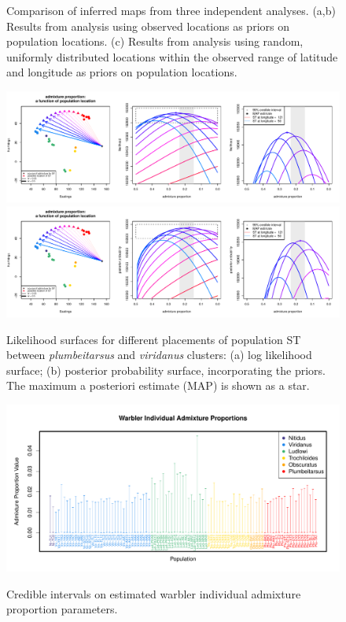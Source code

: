 \documentclass[10pt,letterpaper]{article}
\begin{document}
\begin{figure}
	\caption{Comparison of inferred maps from three independent analyses.  (a,b) Results from analysis using observed locations as priors on population locations.  (c) Results from analysis using random, uniformly distributed locations within the observed range of latitude and longitude as priors on population locations.}\label{sfig:warbler_pop_compare}
\end{figure}

\begin{figure}
	\centering
			{\includegraphics[width=\textwidth]{../figs/warblers/admix_prop_func_loc_lnl.pdf}}
			{\includegraphics[width=\textwidth]{../figs/warblers/admix_prop_func_loc_prob.pdf}}
	\caption{Likelihood surfaces for different placements of population ST between \textit{plumbeitarsus} and \textit{viridanus} clusters: (a) log likelihood surface; (b) posterior probability surface, incorporating the priors. The maximum a posteriori estimate (MAP) is shown as a star. }\label{sfig:admix_prop_func_loc}
\end{figure}

\clearpage

\begin{figure}
\centering
	{\includegraphics[width=\textwidth]{../figs/warblers/warb_ind_adprop.pdf}}
	\caption{Credible intervals on estimated warbler individual admixture proportion parameters.}\label{sfig:warb_ind_adprops}
\end{figure}
\end{document}
